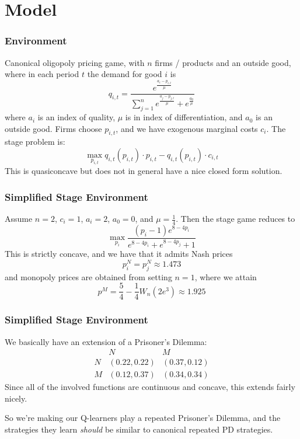 \documentclass{beamer}
\begin{document}
\section{Model}

\begin{frame}\frametitle{Environment}
	Canonical oligopoly pricing game, with $n$ firms / products and an outside good, where in each period $t$ the demand for good $i$ is \[q_{i,t} = \frac{e^{\frac{a_i-p_{i,t}}{\mu}}}{\sum_{j=1}^n e^{\frac{a_j - p_{j,t}}{\mu}} + e^{\frac{a_0}{\mu}}}\]where $a_i$ is an index of quality, $\mu$ is in index of differentiation, and $a_0$ is an outside good. Firms choose $p_{i,t}$, and we have exogenous marginal costs $c_i$. The stage problem is:\[\max_{p_{i,t}} q_{i,t}(p_{i,t}) \cdot p_{i,t} - q_{i,t}(p_{i,t}) \cdot c_{i,t}\]This is quasiconcave but does not in general have a nice closed form solution.
\end{frame}
\begin{frame}\frametitle{Simplified Stage Environment}
	Assume $n=2$, $c_i = 1$, $a_i = 2$, $a_0=0$, and $\mu = \frac{1}{4}$. Then the stage game reduces to\[\max_{p_i} \frac{(p_i - 1)e^{8 - 4p_{i}}}{e^{8 - 4p_{i}} + e^{8 - 4p_{j}} + 1}\]This is strictly concave, and we have that it admits Nash prices\[p^N_i = p^N_j \approx 1.473\]and monopoly prices are obtained from setting $n=1$, where we attain \[p^M = \frac{5}{4} - \frac{1}{4}W_n(2e^{3}) \approx 1.925\]
\end{frame}
\begin{frame}\frametitle{Simplified Stage Environment}
	We basically have an extension of a Prisoner's Dilemma:
	\[
	\begin{array}{c|cc}
		& N & M \\\hline N & (0.22,0.22) & (0.37,0.12) \\ M &(0.12,0.37) & (0.34,0.34)
	\end{array}	\]
	Since all of the involved functions are continuous and concave, this extends fairly nicely. 
	
	So we're making our Q-learners play a repeated Prisoner's Dilemma, and the strategies they learn \emph{should} be similar to canonical repeated PD strategies.
\end{frame}















































	
\end{document}
